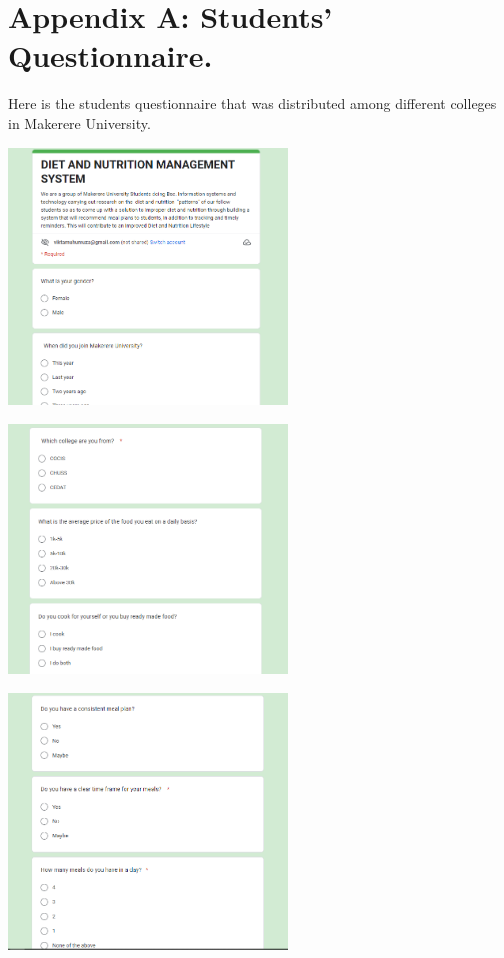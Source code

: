 \documentclass{article}
\begin{document}
\newpage
\setlength{}
\printbibliography


\newpage
\appendix
\renewcommand{\thesection}{} %
\section{Appendix A: Students' Questionnaire.}

Here is the students questionnaire that was distributed among different colleges in Makerere University.

\vspace{30pt}
\begin{center}

\includegraphics[width=280px]{images/questionnaire1.PNG}

 \includegraphics[width=280px]{images/questionnaire2.PNG}

\includegraphics[width=280px]{images/questionnaire3.PNG} 


\end{center}
\end{document}
